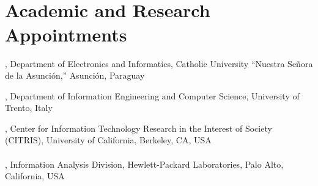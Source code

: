 
\section{\\Academic and Research Appointments}

, Department of Electronics and Informatics, Catholic University ``Nuestra Señora de la Asunción,'' Asunción, Paraguay 

, Department of Information Engineering and Computer Science, University of Trento, Italy 

, Center for Information Technology Research in the Interest of Society (CITRIS), University of California, Berkeley, CA, USA \\\\
, Information Analysis Division, Hewlett-Packard Laboratories, Palo Alto, California, USA 
